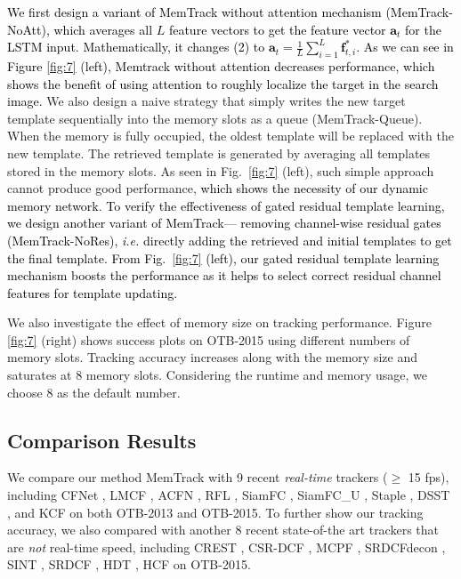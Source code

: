 \documentclass[runningheads]{llncs}
\newcommand{\yty}[1]{\textcolor{black}{#1}}
\newcommand{\abc}[1]{\textcolor{black}{#1}}
\newcommand{\abcn}[1]{\textcolor{black}{#1}}
\begin{document}
\yty{ We first design a variant of MemTrack without attention mechanism (MemTrack-NoAtt), which averages all $L$ feature vectors to get the %
feature vector $\mathbf{a}_t$ \abcn{for the LSTM input.} 
Mathematically, it changes %
(2) to $\mathbf{a}_t = \frac{1}{L}\sum_{i=1}^{L}\mathbf{f}^*_{t,i} $. As we can see in Figure \ref{fig:7} (left), Memtrack without attention decreases performance, \abc{which shows the benefit of using attention to roughly localize the target in the search image.}} 
We also design a naive strategy that simply writes the new target template sequentially into the memory slots as a queue (MemTrack-Queue). When the memory is fully occupied, the oldest template will be replaced with the new  template. The retrieved template is generated by averaging all templates stored in the memory slots. As seen in Fig.~\ref{fig:7} (left), such simple approach cannot produce good performance, \abc{which shows the necessity of our dynamic memory network}. 
\yty{To verify the effectiveness of \abc{gated} residual template learning, we design another variant of MemTrack--- removing channel-wise residual gates (MemTrack-NoRes), \emph{i.e.} directly adding the retrieved and initial templates to get the final template. From Fig.~\ref{fig:7} (left), our \abc{gated} residual template learning mechanism boosts the performance as it helps to select correct residual channel features for template updating.}

We also investigate the effect of memory size  on tracking performance. Figure \ref{fig:7} (right) shows success plots on OTB-2015 using different numbers of memory slots. Tracking accuracy increases along with the memory size and saturates at 8 memory slots. Considering the runtime and memory usage, we choose 8 as the default number. %

\subsection{Comparison Results}

We compare our method MemTrack with 9 recent {\em real-time} trackers ($\geq$ 15 fps), including CFNet \cite{Valmadre2017}, LMCF \cite{Wang2017}, ACFN \cite{Choi2017}, RFL \cite{Yang2017}, SiamFC \cite{Bertinetto2016}, SiamFC\_U \cite{Valmadre2017}, Staple \cite{Bertinetto2016-1}, DSST \cite{Danelljan2014}, and KCF \cite{Henriques2015} on both OTB-2013 and OTB-2015. 
To further show our tracking accuracy, we also compared with another 8 recent state-of-the art trackers that are {\em not} real-time speed, including CREST \cite{Song2017},  CSR-DCF \cite{Lukezic2017}, MCPF \cite{Zhang2017}, SRDCFdecon \cite{Danelljan2016}, SINT \cite{Tao2016}, SRDCF \cite{Danelljan2015}, HDT \cite{Qi2016}, HCF \cite{Ma2015} on OTB-2015.
\end{document}
